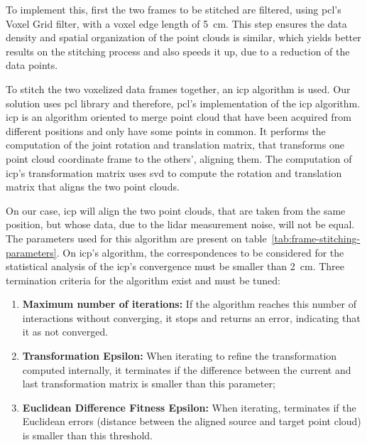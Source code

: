 To implement this, first the two frames to be stitched are filtered, using \ac{pcl}'s Voxel Grid filter, with a voxel edge length of \SI{5}{\centi\meter}. This step ensures the data density and spatial organization of the point clouds is similar, which yields better results on the stitching process and also speeds it up, due to a reduction of the data points.

To stitch the two voxelized data frames together, an \ac{icp} algorithm is used. Our solution uses \ac{pcl} library and therefore, \ac{pcl}'s implementation of the \ac{icp} algorithm. \ac{icp} is an algorithm oriented to merge point cloud that have been acquired from different positions and only have some points in common. It performs the computation of the joint rotation and translation matrix, that transforms one point cloud coordinate frame to the others', aligning them. The computation of \ac{icp}'s transformation matrix uses \ac{svd} to compute the rotation and translation matrix that aligns the two point clouds.

On our case, \ac{icp} will align the two point clouds, that are taken from the same position, but whose data, due to the \ac{lidar} measurement noise, will not be equal. The parameters used for this algorithm are present on table~\ref{tab:frame-stitching-parameters}. On \ac{icp}'s algorithm, the correspondences to be considered for the statistical analysis of the \ac{icp}'s convergence must be smaller than \SI{2}{\centi\meter}. Three termination criteria for the algorithm exist and must be tuned:

\begin{enumerate}
\item \textbf{Maximum number of iterations:} If the algorithm reaches this number of interactions without converging, it stops and returns an error, indicating that it as not converged.
\item \textbf{Transformation Epsilon:} When iterating to refine the transformation computed internally, it terminates if the difference between the current and last transformation matrix is smaller than this parameter;
\item \textbf{Euclidean Difference Fitness Epsilon:} When iterating, terminates if the Euclidean errors (distance between the aligned source and target point cloud) is smaller than this threshold.
\end{enumerate}


